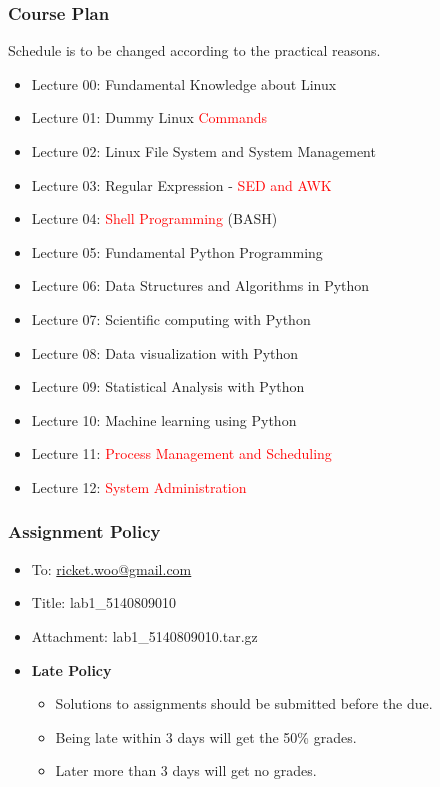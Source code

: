 \documentclass[red]{beamer}
\begin{document}
\begin{CJK*}{GBK}{kai}
\begin{frame}
\frametitle{Course Plan}
Schedule is to be changed according to the practical reasons.
\begin{itemize}
	\item Lecture 00: Fundamental Knowledge about Linux
	\item Lecture 01: Dummy Linux \textcolor{red}{Commands}
    \item Lecture 02: Linux File System and System Management
    \item Lecture 03: Regular Expression - \textcolor{red}{SED and AWK}
    \item Lecture 04: \textcolor{red}{Shell Programming} (BASH)
    \item Lecture 05: Fundamental Python Programming
    \item Lecture 06: Data Structures and Algorithms in Python
	\item Lecture 07: Scientific computing with Python
	\item Lecture 08: Data visualization with Python
	\item Lecture 09: Statistical Analysis with Python
	\item Lecture 10: Machine learning using Python
    \item Lecture 11: \textcolor{red}{Process Management and Scheduling}
    \item Lecture 12: \textcolor{red}{System Administration}
\end{itemize}
\end{frame}


\begin{frame}
\frametitle{Assignment Policy}
\begin{itemize}
    \item To: \url{ricket.woo@gmail.com}
    \item Title: lab1\_5140809010
    \item Attachment: lab1\_5140809010.tar.gz
    \item \textbf{Late Policy}
    \begin{itemize}
        \item Solutions to assignments should be submitted before the due.
        \item Being late within 3 days will get the 50\% grades.
        \item Later more than 3 days will get no grades.
    \end{itemize}
\end{itemize}
\end{frame}


\end{CJK*}
\end{document}
